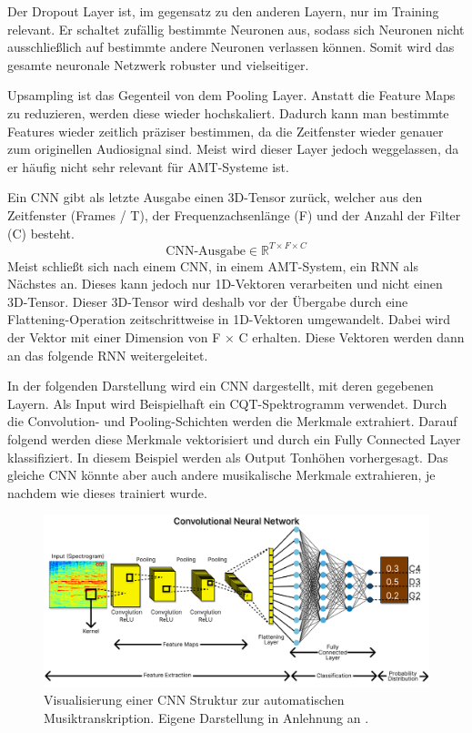 Der Dropout Layer ist, im gegensatz zu den anderen Layern, nur im Training relevant.
Er schaltet zufällig bestimmte Neuronen aus,
sodass sich Neuronen nicht ausschließlich auf bestimmte andere Neuronen verlassen können.
Somit wird das gesamte neuronale Netzwerk robuster und vielseitiger.

Upsampling ist das Gegenteil von dem Pooling Layer.
Anstatt die Feature Maps zu reduzieren, werden diese wieder hochskaliert.
Dadurch kann man bestimmte Features wieder zeitlich präziser bestimmen,
da die Zeitfenster wieder genauer zum originellen Audiosignal sind.
Meist wird dieser Layer jedoch weggelassen, da er häufig nicht sehr relevant für AMT-Systeme ist.

Ein CNN gibt als letzte Ausgabe einen 3D-Tensor zurück,
welcher aus den Zeitfenster (Frames / T), der Frequenzachsenlänge (F) und der Anzahl der Filter (C) besteht.
\[
\text{CNN-Ausgabe} \in \mathbb{R}^{T \times F \times C}
\]
Meist schließt sich nach einem CNN, in einem AMT-System, ein RNN als Nächstes an.
Dieses kann jedoch nur 1D-Vektoren verarbeiten und nicht einen 3D-Tensor.
Dieser 3D-Tensor wird deshalb vor der Übergabe durch eine Flattening-Operation
zeitschrittweise in 1D-Vektoren umgewandelt.
Dabei wird der Vektor mit einer Dimension von F × C erhalten.
Diese Vektoren werden dann an das folgende RNN weitergeleitet.

In der folgenden Darstellung wird ein CNN dargestellt, mit deren gegebenen Layern.
Als Input wird Beispielhaft ein CQT-Spektrogramm verwendet.
Durch die Convolution- und Pooling-Schichten werden die Merkmale extrahiert.
Darauf folgend werden diese Merkmale vektorisiert und durch ein Fully Connected Layer klassifiziert.
In diesem Beispiel werden als Output Tonhöhen vorhergesagt.
Das gleiche CNN könnte aber auch andere musikalische Merkmale extrahieren, je nachdem wie dieses trainiert wurde.
\begin{figure}[H]
    \centering
    \includegraphics[width=1\textwidth]{Graphics/CNN}
    \caption[CNN Struktur]{Visualisierung einer CNN Struktur zur automatischen Musiktranskription. Eigene Darstellung in Anlehnung an \cite{shahriar2020cnn}.}
    \label{fig:cnn-amt}
\end{figure}

